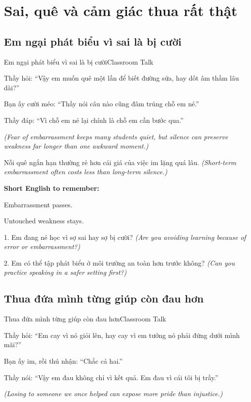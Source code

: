 \chapter{Sai, quê và cảm giác thua rất thật}

\section{Em ngại phát biểu vì sai là bị cười}
\begin{truyen}{Em ngại phát biểu vì sai là bị cười}{Classroom Talk}

Thầy hỏi: ``Vậy em muốn quê một lần để biết đường sửa, hay dốt âm thầm lâu dài?''

Bạn ấy cười méo: ``Thầy nói câu nào cũng đâm trúng chỗ em né.''

Thầy đáp: ``Vì chỗ em né lại chính là chỗ em cần bước qua.''

\textit{(Fear of embarrassment keeps many students quiet, but silence can preserve weakness far longer than one awkward moment.)}
\end{truyen}

\begin{baihoc}
Nỗi quê ngắn hạn thường rẻ hơn cái giá của việc im lặng quá lâu.
\textit{(Short-term embarrassment often costs less than long-term silence.)}
\end{baihoc}

\begin{ghinhoanh}
\textbf{Short English to remember:}

Embarrassment passes.

Untouched weakness stays.
\end{ghinhoanh}

\begin{tuhocnhanh}
1. Em đang né học vì sợ sai hay sợ bị cười? \textit{(Are you avoiding learning because of error or embarrassment?)}

2. Em có thể tập phát biểu ở môi trường an toàn hơn trước không? \textit{(Can you practice speaking in a safer setting first?)}
\end{tuhocnhanh}
\ngancach

\section{Thua đứa mình từng giúp còn đau hơn}
\begin{truyen}{Thua đứa mình từng giúp còn đau hơn}{Classroom Talk}

Thầy hỏi: ``Em cay vì nó giỏi lên, hay cay vì em tưởng nó phải đứng dưới mình mãi?''

Bạn ấy im, rồi thú nhận: ``Chắc cả hai.''

Thầy nói: ``Vậy em đau không chỉ vì kết quả. Em đau vì cái tôi bị trầy.''

\textit{(Losing to someone we once helped can expose more pride than injustice.)}
\end{truyen}

